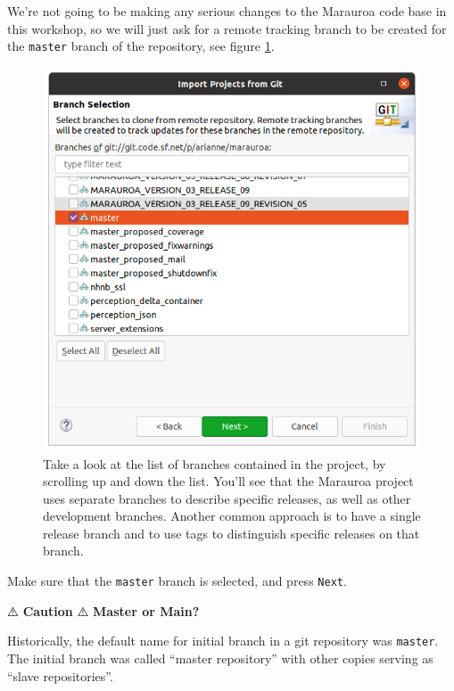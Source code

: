 \documentclass[
]{book}
\begin{document}
We're not going to be making any serious changes to the Marauroa code base in this workshop, so we will just ask for a remote tracking branch to be created for the \texttt{master} branch of the repository, see figure \ref{fig:selectMarauroaBranches-fig}.

\begin{figure}

{\centering \includegraphics[width=1\linewidth]{images/1.4selectMarauroaBranches} 

}

\caption{Take a look at the list of branches contained in the project, by scrolling up and down the list. You'll see that the Marauroa project uses separate branches to describe specific releases, as well as other development branches. Another common approach is to have a single release branch and to use tags to distinguish specific releases on that branch.}\label{fig:selectMarauroaBranches-fig}
\end{figure}

Make sure that the \texttt{master} branch is selected, and press \texttt{Next}.

⚠️ \textbf{Caution} ⚠️
\textbf{Master or Main?}

Historically, the default name for initial branch in a git repository was \texttt{master}. The initial branch was called ``master repository'' with other copies serving as ``slave repositories''.
\end{document}
